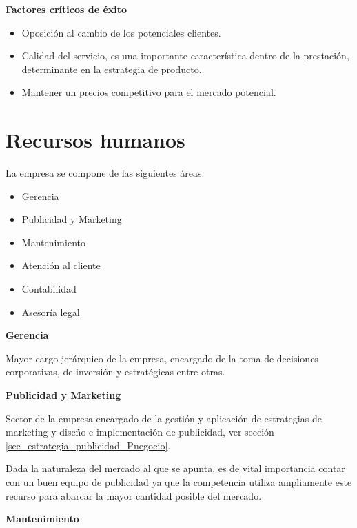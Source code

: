 \documentclass[12pt,a4paper]{book}
\begin{document}
\noindent\textbf{Factores críticos de éxito}

\begin{itemize}
\item Oposición al cambio de los potenciales clientes.
\item Calidad del servicio, es una importante característica dentro de la prestación, determinante en la estrategia de producto.
\item Mantener un precios competitivo para el mercado potencial.
\end{itemize}


\section{Recursos humanos}\label{sec_recursos_humanos_Pnegocio}

La empresa se compone de las siguientes áreas.

\begin{itemize}
\item Gerencia
\item Publicidad y Marketing
\item Mantenimiento
\item Atención al cliente
\item Contabilidad
\item Asesoría legal
\end{itemize}

\noindent \textbf{Gerencia}

\medskip

Mayor cargo jerárquico de la empresa, encargado de la toma de decisiones corporativas, de inversión y estratégicas entre otras.

\medskip 

\noindent \textbf{Publicidad y Marketing}

\medskip 

Sector de la empresa encargado de la gestión y aplicación de estrategias de marketing y diseño e implementación de publicidad, ver sección \ref{sec_estrategia_publicidad_Pnegocio}. 

\medskip 

Dada la naturaleza del mercado al que se apunta, es de vital importancia contar con un buen equipo de publicidad ya que la competencia utiliza ampliamente este recurso para abarcar la mayor cantidad posible del mercado. 

\medskip 

\noindent \textbf{Mantenimiento}
\end{document}
